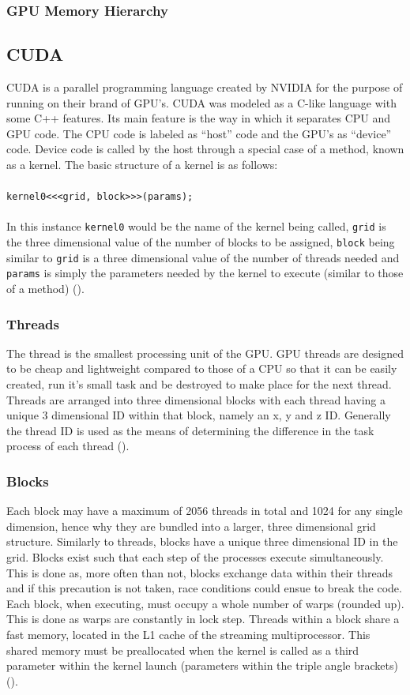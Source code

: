 \subsubsection{GPU Memory Hierarchy}
\subsection{CUDA}\label{soft:sec:cuda}
CUDA is a parallel programming language created by NVIDIA for the purpose of running on their brand of GPU's. CUDA was modeled as a C-like language with some C++ features. Its main feature is the way in which it separates CPU and GPU code. The CPU code is labeled as ``host'' code and the GPU's as ``device'' code. Device code is called by the host through a special case of a method, known as a kernel. The basic structure of a kernel is as follows: 
\\
\\
\texttt{kernel0<<<grid, block>>>(params);}
\\
\\
In this instance \texttt{kernel0} would be the name of the kernel being called, \texttt{grid} is the three dimensional value of the number of blocks to be assigned, \texttt{block} being similar to \texttt{grid} is a three dimensional value of the number of threads needed and \texttt{params} is simply the parameters needed by the kernel to execute (similar to those of a method) (\cite{CUDA_DEVKIT}).
%
\subsubsection{Threads}\label{soft:ssec:thread}
The thread is the smallest processing unit of the GPU. GPU threads are designed to be cheap and lightweight compared to those of a CPU so that it can be easily created, run it's small task and be destroyed to make place for the next thread. Threads are arranged into three dimensional blocks with each thread having a unique 3 dimensional ID within that block, namely an x, y and z ID. Generally the thread ID is used as the means of determining the difference in the task process of each thread (\cite{CUDA_DEVKIT}).
%
\subsubsection{Blocks}\label{soft:ssec:block}
Each block may have a maximum of 2056 threads in total and 1024 for any single dimension, hence why they are bundled into a larger, three dimensional grid structure. Similarly to threads, blocks have a unique three dimensional ID in the grid. Blocks exist such that each step of the processes execute simultaneously. This is done as, more often than not, blocks exchange data within their threads and if this precaution is not taken, race conditions could ensue to break the code. Each block, when executing, must occupy a whole number of warps (rounded up). This is done as warps are constantly in lock step. Threads within a block share a fast memory, located in the L1 cache of the streaming multiprocessor. This shared memory must be preallocated when the kernel is called as a third parameter within the kernel launch (parameters within the triple angle brackets) (\cite{CUDA_DEVKIT}).
%
